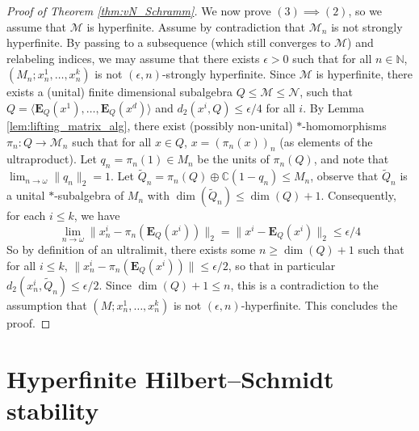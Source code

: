 \documentclass[11pt]{amsart}
\newcommand{\ultlim}[1]{\lim_{#1 \to \omega}}
\newcommand{\N}{{\mathbb{N}}}
\newcommand{\C}{{\mathbb{C}}}
\newcommand{\bE}{{\mathbf{E}}}
\theoremstyle{definition}
\theoremstyle{remark}
\newtheorem{remark}[theorem]{Remark}
\theoremstyle{definition}
\newcommand{\admid}[1]{\begingroup\color{orange}Alon: #1\endgroup}
\begin{document}
\begin{proof}[Proof of Theorem \ref{thm:vN_Schramm}]
        We now prove $(3) \implies (2)$, so we assume that $\mathcal M$ is hyperfinite. Assume by contradiction that $\mathcal M_n$ is not strongly hyperfinite. 
        By passing to a subsequence (which still converges to $\mathcal M$) and relabeling indices, we may assume that there exists $\epsilon >0$ such that for all $n \in \N$, $(M_n; x^1_n, \dots, x^k_n)$ is not $(\epsilon, n)$-strongly hyperfinite.
        Since $\mathcal M$ is hyperfinite, there exists a (unital) finite dimensional subalgebra $Q \leq \mathcal M \leq \mathcal N$, such that $Q = \langle \bE_Q(x^1), \dots, \bE_Q(x^d) \rangle$ and $d_2(x^i, Q) \leq \epsilon/4$ for all $i$. 
        By Lemma \ref{lem:lifting_matrix_alg}, there exist  (possibly non-unital) $*$-homomorphisms $\pi_n: Q \to  \mathcal M_n$ such that for all $x \in Q$, $x = (\pi_n(x))_n$ (as elements of the ultraproduct).
        Let $q_n = \pi_n(1) \in M_n$ be the units of $\pi_n(Q)$, and note that $\ultlim{n} \| q_n \|_2 = 1$.
        Let $\tilde{Q}_n = \pi_n(Q) \oplus \C(1-q_n) \leq M_n$,  observe that $\tilde{Q}_n $ is a unital $*$-subalgebra of $M_n$ with $\dim (\tilde{Q}_n ) \leq \dim(Q) + 1$.
        Consequently, for each $i \leq k$, we have
        $$\lim_{n \to \omega} \| x^i_n - \pi_n(\bE_Q(x^i)) \|_2 =  \| x^i - \bE_Q(x^i) \|_2 \leq \epsilon/4$$ 
        So by definition of an ultralimit, there exists some $n \geq \dim(Q) + 1$ such that for all $i \leq k$, $\| x^i_n - \pi_n(\bE_Q(x^i)) \| \leq \epsilon/2$, so that in particular $d_2(x_n^i, \tilde{Q}_n ) \leq \epsilon/2$.
        Since $\dim(Q) + 1 \leq n$, this is a contradiction to the assumption that $(M; x_n^1, \dots, x_n^k)$ is not $(\epsilon, n)$-hyperfinite.
        This concludes the proof.
        
\end{proof}

\section{Hyperfinite Hilbert--Schmidt stability} \label{sec:hyp_HS_stab}
\end{document}
